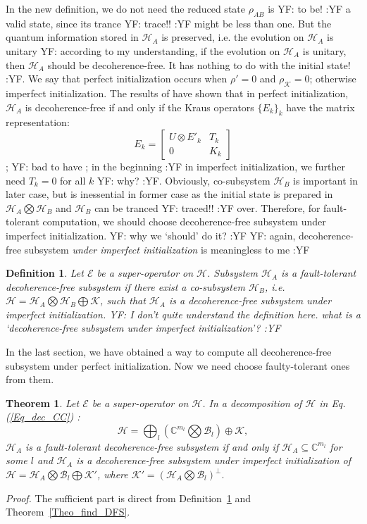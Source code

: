\documentclass[journal]{IEEEtran}
\def\h{\ensuremath{\mathcal{H}}}
\def\k{\ensuremath{\mathcal{K}}}
\def\b{\ensuremath{\mathcal{B}}}
\def\e{\ensuremath{\mathcal{E}}}
\def\k{\mathcal{K}}
\newtheorem{theorem}{Theorem}
\newtheorem{definition}{Definition}
\newcommand{\authorComment}[3]{\color{#1}#2: {#3} :#2\color{black}}
\newcommand{\yf}[1]{\authorComment{blue}{YF}{#1}}
\begin{document}
In the new definition, we do not need the reduced state $\rho_{AB}$ is \yf{to be!} a valid state, since its trance \yf{trace!!} might be less than one. But the quantum  information stored in $\h_A$ is preserved, i.e. the evolution on $\h_A$ is unitary \yf{according to my understanding, if the evolution on $\h_A$ is unitary, then $\h_A$ should be decoherence-free. It has nothing to do with the initial state!}. We say that perfect initialization occurs when $\rho'=0$ and $\rho_{\k}=0$; otherwise imperfect initialization. The results of \cite{shabani2005theory} have shown that in perfect initialization, $\h_A$ is decoherence-free if and only if the Kraus operators $\{E_k\}_k$ have the matrix representation:
$$E_{k}=\left [\begin{matrix}
  U\otimes E'_{k}&T_k\\
  0&K_k
\end{matrix}\right]$$
; \yf{bad to have ; in the beginning} in imperfect initialization, we further need  $T_{k}=0$ for all $k$ \yf{why?}.
Obviously, co-subsystem $\h_B$ is important in later case, but is inessential in former case as the initial state is prepared in $\h_A\bigotimes \h_B$ and $\h_B$ can be tranced  \yf{traced!!} over. Therefore, for fault-tolerant computation, we should choose decoherence-free subsystem under imperfect initialization.  \yf{why we `should' do it?} \yf{again, decoherence-free subsystem \emph{under imperfect initialization} is meaningless to me}
\begin{definition}\label{Def_new_dfs}
  Let $\e$ be a super-operator on $\h$.  Subsystem $\h_A$  is a fault-tolerant decoherence-free subsystem if there exist a co-subsystem $\h_B$, i.e. $\h=\h_A\bigotimes \h_B\bigoplus\k$, such that $\h_A$ is a decoherence-free subsystem under imperfect initialization. \yf{I don't quite understand the definition here. what is a `decoherence-free subsystem under imperfect initialization'?}
\end{definition}

In the last section, we have obtained a way to compute all decoherence-free subsystem under perfect initialization. Now we need choose faulty-tolerant ones from them.
\begin{theorem}\label{Theo_check_FT}
  Let $\e$ be a super-operator  on $\h$. In a decomposition of $\h$ in Eq.(\ref{Eq_dec_CC}) :
$$\h=\bigoplus_l(\mathbb{C}^{m_l}\bigotimes \b_l)\oplus \k,$$ 
$\h_A$ is a fault-tolerant decoherence-free subsystem if and only if $\h_A\subseteq \mathbb{C}^{m_l}$ for some $l$ and $\h_A$ is a decoherence-free subsystem under imperfect initialization of $\h=\h_A\bigotimes \b_l\bigoplus \k'$, where $\k'=(\h_A\bigotimes \b_l)^{\perp}.$
\end{theorem}
{\it Proof.} The sufficient part is direct from Definition~\ref{Def_new_dfs} and Theorem~\ref{Theo_find_DFS}.
\end{document}
